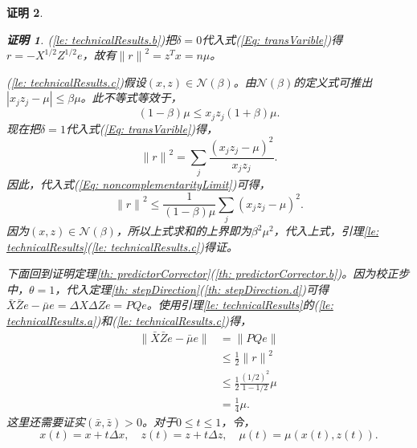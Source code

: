 \documentclass{ctexart}
\numberwithin{equation}{section} %
\newtheorem*{Proof}{证明}
\begin{document}
\begin{Proof}
\begin{Proof}
		(\ref{le: technicalResults.b})把$ \delta = 0 $代入式(\ref{Eq: transVarible})得$ r = -X^{1/2}Z^{1/2}e $，故有$ {\parallel r \parallel}^2 = z^Tx = n\mu $。
		
		(\ref{le: technicalResults.c})假设$ \left(x, z\right) \in \mathcal{N}\left(\beta\right) $。由$ \mathcal{N}\left(\beta\right) $的定义式可推出$ |x_jz_j - \mu| \leq \beta\mu $。此不等式等效于，
		\begin{equation}
			\label{Eq: noncomplementarityLimit}
			\left(1 - \beta\right)\mu \leq x_jz_j \left(1 + \beta\right)\mu.
		\end{equation}
		现在把$ \delta = 1 $代入式(\ref{Eq: transVarible})得，
		\begin{equation}
			{\parallel r \parallel}^2 = \sum_j \frac{\left(x_jz_j - \mu\right)^2}{x_jz_j}. \nonumber
		\end{equation}
		因此，代入式(\ref{Eq: noncomplementarityLimit})可得，
		\begin{equation}
			{\parallel r \parallel}^2 \leq \frac{1}{\left(1 - \beta\right)\mu}\sum_j \left(x_jz_j - \mu\right)^2. \nonumber
		\end{equation}
		因为$ \left(x, z\right) \in \mathcal{N}\left(\beta\right) $，所以上式求和的上界即为$ {\beta}^2{\mu}^2 $，代入上式，引理\ref{le: technicalResults}(\ref{le: technicalResults.c})得证。
	\end{Proof}
	下面回到证明定理\ref{th: predictorCorrector}(\ref{th: predictorCorrector.b})。因为校正步中，$ \theta = 1 $，代入定理\ref{th: stepDirection}(\ref{th: stepDirection.d})可得$ \bar{X}\bar{Z}e - \bar{\mu}e = \Delta X \Delta Ze = PQe $。使用引理\ref{le: technicalResults}的(\ref{le: technicalResults.a})和(\ref{le: technicalResults.c})得，
	\begin{equation}
		\label{Eq: lemmaImply}
		\begin{aligned}
			\parallel \bar{X}\bar{Z}e - \bar{\mu}e \parallel & = \parallel PQe \parallel  \\
			& \leq \frac{1}{2} {\parallel r \parallel}^2 \\
			& \leq \frac{1}{2} \frac{\left(1/2\right)^2}{1 - 1/2}\mu \\
			& = \frac{1}{4}\mu. 
		\end{aligned}
	\end{equation}
	这里还需要证实$ \left(\bar{x}, \bar{z}\right) > 0 $。对于$ 0 \leq t \leq 1 $，令，
	\begin{equation}
		x\left(t\right) = x + t\Delta x, \quad z\left(t\right) = z + t\Delta z, \quad \mu\left(t\right) = \mu\left(x\left(t\right), z\left(t\right)\right). \nonumber

\end{equation}
\end{Proof}
\end{document}
